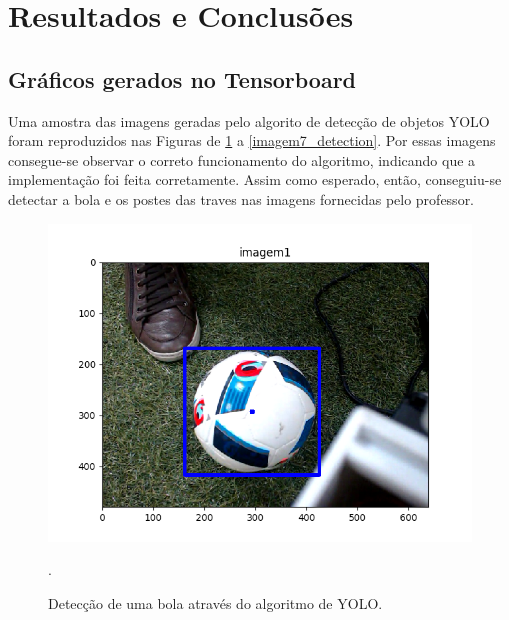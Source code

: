 \documentclass[conference]{IEEEtran}
\begin{document}
\section{Resultados e Conclusões}

\subsection{Gráficos gerados no Tensorboard}
Uma amostra das imagens geradas pelo algorito de detecção de objetos YOLO foram reproduzidos nas Figuras de \ref{imagem1_detection} a \ref{imagem7_detection}. Por essas imagens consegue-se observar o correto funcionamento do algoritmo, indicando que a implementação foi feita corretamente. Assim como esperado, então, conseguiu-se detectar a bola e os postes das traves nas imagens fornecidas pelo professor.

\begin{figure}[htbp]
\centering
\centerline{\includegraphics[scale=0.5]{imagens/imagem1_detection.png}}
\caption{Detecção de uma bola através do algoritmo de YOLO.}.
\label{imagem1_detection}
\end{figure}
\end{document}
